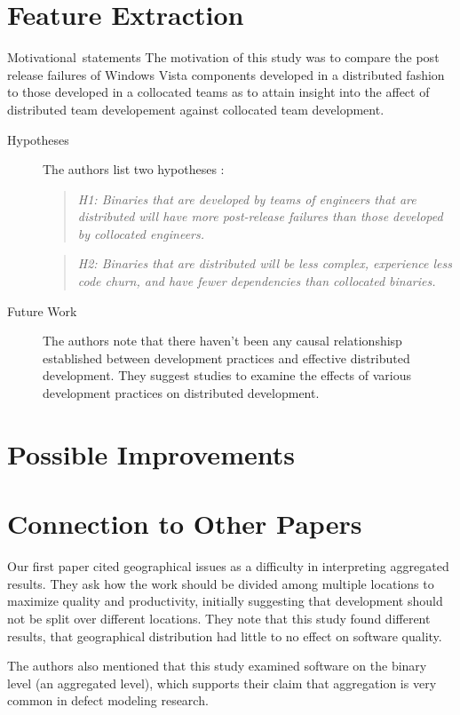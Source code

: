 \documentclass[english]{article}
\begin{document}
\section*{Feature Extraction}
\item [{Motivational~statements}] The motivation of this study was to compare the post release failures of Windows Vista components developed in a distributed fashion to those developed in a collocated teams as to attain insight into the affect of distributed team developement against collocated team development.
\begin{description}
\item[Hypotheses] The authors list two hypotheses \cite{bird09}: 
\begin{quote}
\emph{H1: Binaries that are developed by teams of engineers that are distributed will have more post-release failures than those developed by collocated engineers.}
\end{quote}
\begin{quote}
\emph{H2: Binaries that are distributed will be less complex, experience less code churn, and have fewer dependencies than collocated binaries.}
\end{quote}
\item[Future Work] The authors note that there haven't been any causal relationshisp established between development practices and effective distributed development. They suggest studies to examine the effects of various development practices on distributed development.
\end{description}

\section*{Possible Improvements}

\section*{Connection to Other Papers}
	Our first paper \cite{posnett11} cited geographical issues as a difficulty in interpreting aggregated results. They ask how the work should be divided among multiple locations to maximize quality and productivity, initially suggesting that development should not be split over different locations. They note that this study found different results, that geographical distribution had little to no effect on software quality. 

The authors also mentioned that this study examined software on the binary level (an aggregated level), which supports their claim that aggregation is very common in defect modeling research.




\end{document}
